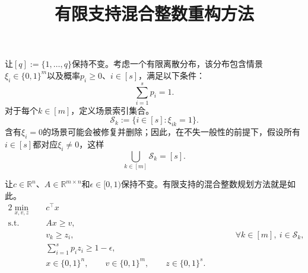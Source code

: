 \documentclass[11pt,a4paper]{article}
\title{有限支持混合整数重构方法}
\author{}
\date{}
\begin{document}
\maketitle

让$[q]:=\{1,\ldots,q\}$保持不变。考虑一个有限离散分布，该分布包含情景$\xi_i\in\{0,1\}^m$以及概率$p_i\geq 0$、$i\in[s]$，满足以下条件：
\[
\sum_{i=1}^{s}p_i=1.
\]
对于每个$k\in[m]$，定义场景索引集合。
\[
\mathcal{S}_k:=\{i\in[s]:\xi_{ik}=1\}.
\]
含有$\xi_i=0$的场景可能会被修复并删除；因此，在不失一般性的前提下，假设所有$i\in[s]$都对应$\xi_i\neq 0$，这样
\[
\bigcup_{k\in[m]}\mathcal{S}_k=[s].
\]

让$c\in\mathbb{R}^n$、$A\in\mathbb{R}^{m\times n}$和$\epsilon\in[0,1)$保持不变。有限支持的混合整数规划方法就是如此。
\begin{alignat}{2}
\min_{x,v,z}\quad & c^{\top}x \\
\text{s.t.}\quad
& Ax\geq v, \tag{1}\\
& v_k\geq z_i, &&\qquad \forall k\in[m],\ i\in\mathcal{S}_k, \tag{2}\\
& \sum_{i=1}^{s}p_i z_i\geq 1-\epsilon, \tag{3}\\
& x\in\{0,1\}^n,\qquad v\in\{0,1\}^m,\qquad z\in\{0,1\}^s. \tag{4}
\end{alignat}
\end{document}
